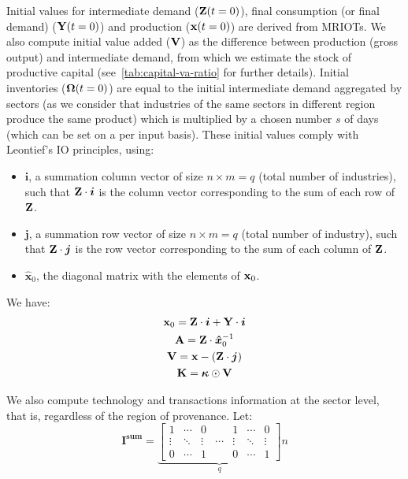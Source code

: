 Initial values for intermediate demand ($\mathbf{Z}(t=0)$), final consumption (or final demand)
($\mathbf{Y}(t=0)$) and production ($\mathbf{x}(t=0)$) are derived from MRIOTs. We also
compute initial value added ($\mathbf{V}$) as the difference between production (gross
output) and intermediate demand, from which we estimate the stock of productive
capital (see~\cref{tab:capital-va-ratio} for further details). Initial
inventories ($\mathbf{\Omega}(t=0)$) are equal to the initial intermediate demand aggregated
by sectors (as we consider that industries of the same sectors in different region
produce the same product) which is multiplied by a chosen number $s$ of days (which can
be set on a per input basis). These initial values comply with Leontief's IO
principles, using:
\begin{itemize}
\item $\bm{i}$, a summation column vector of size $n \times m = q$ (total
  number of industries), such that $\mathbf{Z} \cdot \bm{i}$ is the column vector corresponding to the
  sum of each row of $\mathbf{Z}$.
\item $\bm{j}$, a summation row vector of size $n \times m = q$ (total number
  of industry), such that $\mathbf{Z} \cdot \bm{j}$ is the row vector corresponding to the
  sum of each column of $\mathbf{Z}$.
\item $\bm{\hat{x}}_0$, the diagonal matrix with the elements of $\mathbf{x}_0$.
\end{itemize}

We have:
\begin{gather*}
  \mathbf{x}_0 = \mathbf{Z} \cdot \bm{i} + \mathbf{Y} \cdot \bm{i}\\
  \mathbf{A} = \mathbf{Z} \cdot \bm{\hat{x}}_0^{-1}\\
  \mathbf{V} = \mathbf{x} - \left ( \mathbf{Z} \cdot \bm{j} \right )\\
  \mathbf{K} = \bm{\kappa} \odot \mathbf{V}
\end{gather*}



We also compute technology and transactions information at the sector level,
that is, regardless of the region of provenance. Let:
\[
  \bm{I^{\textrm{sum}}} =
  \underbrace{
    \begin{bmatrix}
      1 & \cdots & 0 & & 1 & \cdots & 0 \\
      \vdots & \ddots & \vdots & \cdots & \vdots & \ddots & \vdots \\
      0 & \cdots & 1 & & 0 & \cdots & 1
    \end{bmatrix}
  }_{q} n
\]

